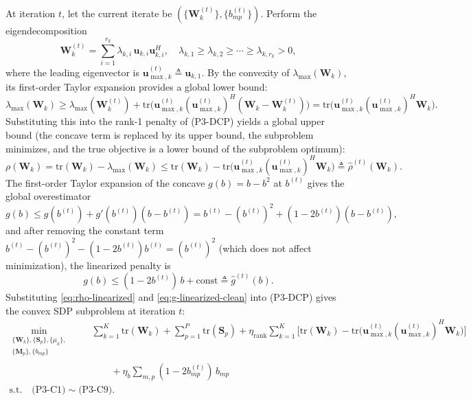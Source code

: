 \documentclass[12pt,a4paper]{article}
\newcommand{\vect}[1]{\mathbf{#1}}
\newcommand{\mat}[1]{\mathbf{#1}}
\newcommand{\tr}{\text{tr}}
\begin{document}
At iteration $t$, let the current iterate be $(\{\mat{W}_k^{(t)}\}, \{b_{mp}^{(t)}\})$. Perform the eigendecomposition
\begin{equation}
\mat{W}_k^{(t)} = \sum_{i=1}^{r_k} \lambda_{k,i} \, \vect{u}_{k,i} \vect{u}_{k,i}^H, \quad \lambda_{k,1} \geq \lambda_{k,2} \geq \cdots \geq \lambda_{k,r_k} > 0,
\end{equation}
where the leading eigenvector is $\vect{u}_{\max,k}^{(t)} \triangleq \vect{u}_{k,1}$. By the convexity of $\lambda_{\max}(\mat{W}_k)$, its first-order Taylor expansion provides a global lower bound:
\begin{equation}\label{eq:lambda-lb}
\lambda_{\max}(\mat{W}_k) \geq \lambda_{\max}(\mat{W}_k^{(t)}) + \tr\Big( \vect{u}_{\max,k}^{(t)} (\vect{u}_{\max,k}^{(t)})^H (\mat{W}_k - \mat{W}_k^{(t)}) \Big) = \tr\Big( \vect{u}_{\max,k}^{(t)} (\vect{u}_{\max,k}^{(t)})^H \mat{W}_k \Big).
\end{equation}
Substituting this into the rank-1 penalty of (P3-DCP) yields a global upper bound (the concave term is replaced by its upper bound, the subproblem minimizes, and the true objective is a lower bound of the subproblem optimum):
\begin{equation}\label{eq:rho-linearized}
\rho(\mat{W}_k) = \tr(\mat{W}_k) - \lambda_{\max}(\mat{W}_k) \leq \tr(\mat{W}_k) - \tr\Big( \vect{u}_{\max,k}^{(t)} (\vect{u}_{\max,k}^{(t)})^H \mat{W}_k \Big) \triangleq \hat{\rho}^{(t)}(\mat{W}_k).
\end{equation}
The first-order Taylor expansion of the concave $g(b) = b - b^2$ at $b^{(t)}$ gives the global overestimator
\begin{equation}\label{eq:g-linearized}
g(b) \leq g(b^{(t)}) + g'(b^{(t)})(b - b^{(t)}) = b^{(t)} - (b^{(t)})^2 + (1 - 2b^{(t)})(b - b^{(t)}),
\end{equation}
and after removing the constant term $b^{(t)} - (b^{(t)})^2 - (1 - 2b^{(t)}) b^{(t)} = (b^{(t)})^2$ (which does not affect minimization), the linearized penalty is
\begin{equation}\label{eq:g-linearized-clean}
g(b) \leq (1 - 2b^{(t)}) \, b + \text{const} \triangleq \hat{g}^{(t)}(b).
\end{equation}
Substituting \eqref{eq:rho-linearized} and \eqref{eq:g-linearized-clean} into (P3-DCP) gives the convex SDP subproblem at iteration $t$:
\begin{equation}\label{eq:p3-sca}
\begin{aligned}
\min_{\substack{\{\mat{W}_k\}, \{\mat{S}_p\}, \{\mu_k\}, \\ \{\mat{M}_p\}, \{b_{mp}\}}} \quad & \sum_{k=1}^K \tr(\mat{W}_k) + \sum_{p=1}^P \tr(\mat{S}_p) + \eta_{\text{rank}} \sum_{k=1}^K \Big[ \tr(\mat{W}_k) - \tr\big( \vect{u}_{\max,k}^{(t)} (\vect{u}_{\max,k}^{(t)})^H \mat{W}_k \big) \Big] \\
& \qquad + \eta_b \sum_{m, p} (1 - 2b_{mp}^{(t)}) \, b_{mp} \\
\text{s.t.} \quad \text{(P3-C1)}\sim\text{(P3-C9)}.
\end{aligned}
\end{equation}
\end{document}
